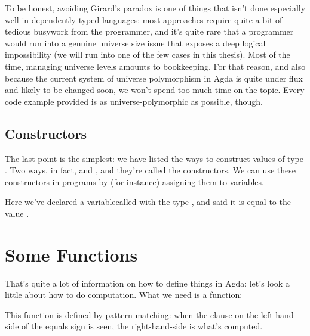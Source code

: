To be honest, avoiding Girard's paradox is one of things that isn't done
especially well in dependently-typed languages: most approaches require quite a
bit of tedious busywork from the programmer, and it's quite rare that a
programmer would run into a genuine universe size issue that exposes a deep
logical impossibility (we will run into one of the few cases in this thesis).
Most of the time, managing universe levels amounts to bookkeeping.
For that reason, and also because the current system of universe polymorphism in
Agda is quite under flux and likely to be changed soon, we won't spend too much
time on the topic.
Every code example provided is as universe-polymorphic as possible, though.

\subsection{Constructors}
The last point is the simplest: we have listed the ways to construct values of
type .
Two ways, in fact,  and
, and they're called the constructors.
We can use these constructors in programs by (for instance) assigning them to
variables.
\begin{multicols}{2}\centering
  \columnbreak
\end{multicols}\vspace{-2\baselineskip}\noindent
Here we've declared a variable\footnotemark\;called  with
the type , and said it is equal to the value
.


\section{Some Functions}
That's quite a lot of information on how to define things in Agda: let's look a
little about how to do computation.
What we need is a function:
\begin{multicols}{2}\centering
  \columnbreak
\end{multicols}\vspace{-2\baselineskip}\noindent
This function is defined by pattern-matching: when the clause on the
left-hand-side of the equals sign is seen, the right-hand-side is what's
computed.

